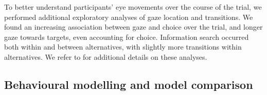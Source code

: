 \documentclass[11pt, a4paper]{article}
\begin{document}
To better understand participants' eye movements over the course of the trial, we performed additional exploratory analyses of gaze location and transitions. We found an increasing association between gaze and choice over the trial, and longer gaze towards targets, even accounting for choice. Information search occurred both within and between alternatives, with slightly more transitions within alternatives. We refer to  for additional details on these analyses.

\subsection*{Behavioural modelling and model comparison}

\end{document}
